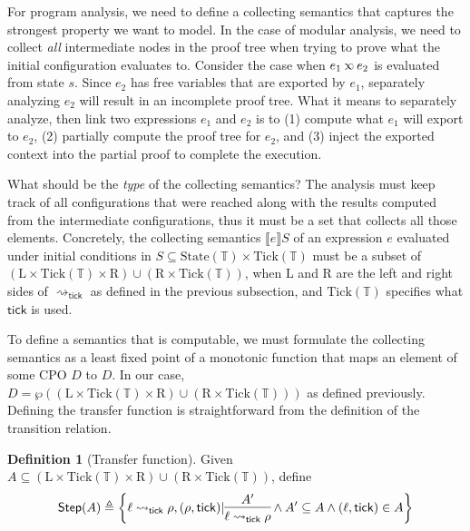 \documentclass[acmsmall,review]{acmart}\settopmatter{printfolios=true,printccs=false,printacmref=false}
\theoremstyle{definition}
\newtheorem{definition}{Definition}[section]
\newcommand*{\Time}{\mathbb{T}}
\newcommand*{\Left}{\text{L}}
\newcommand*{\Right}{\text{R}}
\newcommand*{\State}{\text{State}}
\newcommand*{\Tick}{\text{Tick}}
\newcommand*{\semarrow}{\rightsquigarrow}
\newcommand*{\semlink}{\mathbin{\rotatebox[origin=c]{180}{$\propto$}}}
\newcommand*{\link}[2]{{#1}\semlink{#2}}
\newcommand*{\sembracket}[1]{\lBrack{#1}\rBrack}
\newcommand*{\tick}{\mathsf{tick}}
\begin{document}
For program analysis, we need to define a collecting semantics that captures the strongest property we want to model.
In the case of modular analysis, we need to collect \emph{all} intermediate nodes in the proof tree when trying to prove what the initial configuration evaluates to.
Consider the case when $\link{e_1}{e_2}$ is evaluated from state $s$.
Since $e_2$ has free variables that are exported by $e_1$, separately analyzing $e_2$ will result in an incomplete proof tree.
What it means to separately analyze, then link two expressions $e_1$ and $e_2$ is to (1) compute what $e_1$ will export to $e_2$, (2) partially compute the proof tree for $e_2$, and (3) inject the exported context into the partial proof to complete the execution.

What should be the \emph{type} of the collecting semantics?
The analysis must keep track of all configurations that were reached along with the results computed from the intermediate configurations, thus it must be a set that collects all those elements.
Concretely, the collecting semantics $\sembracket{e}S$ of an expression $e$ evaluated under initial conditions in $S\subseteq\State(\Time)\times\Tick(\Time)$ must be a subset of $(\Left\times\Tick(\Time)\times\Right )\cup(\Right\times\Tick(\Time))$, when $\Left$ and $\Right$ are the left and right sides of $\semarrow_\tick$ as defined in the previous subsection, and $\Tick(\Time)$ specifies what $\tick$ is used.

To define a semantics that is computable, we must formulate the collecting semantics as a least fixed point of a monotonic function that maps an element of some CPO $D$ to $D$.
In our case, $D=\wp((\Left\times\Tick(\Time)\times\Right )\cup(\Right\times\Tick(\Time)))$ as defined previously.
Defining the transfer function is straightforward from the definition of the transition relation.

\begin{definition}[Transfer function]
  Given $A\subseteq(\Left\times\Tick(\Time)\times\Right )\cup(\Right\times\Tick(\Time))$, define
  \[
    \mathsf{Step}(A)\triangleq
    \left\{\ell\semarrow_\tick\rho, (\rho,\tick)|
    \begin{prooftree}[center=true]
      \hypo{A'}\infer1{\ell\semarrow_\tick\rho}
    \end{prooftree}\wedge
    A'\subseteq A\wedge(\ell,\tick)\in A
    \right\}
  \]
\end{definition}
\end{document}
